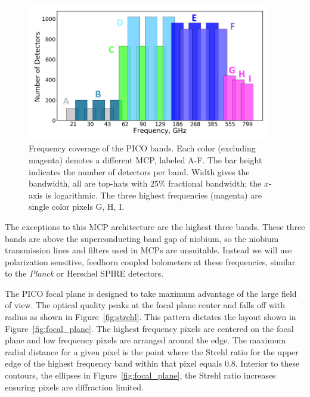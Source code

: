 \documentclass[]{spie}  %
\begin{document}
\begin{figure} [ht]
\begin{center}
\includegraphics[height=6cm]{bands_label.png}
\end{center}
\caption { \label{fig:bands} 
Frequency coverage of the PICO bands. Each color (excluding magenta) denotes a different MCP, labeled A-F. The bar height 
indicates the number of detectors per band.  Width gives the bandwidth, all are top-hats with 
25\% fractional bandwidth; the $x$-axis is logarithmic.  The three highest frequencies (magenta) are single color pixels G, H, I.
}
\end{figure} 

The exceptions to this MCP architecture are the highest three bands.  These three bands are above the superconducting band gap of niobium, so 
the niobium transmission lines and filters used in MCPs are unsuitable.  Instead we will use polarization sensitive, feedhorn 
coupled bolometers at these frequencies, similar to the \textit{Planck}\cite{planck2010_hfi} or Herschel SPIRE\cite{spire2010} detectors.  

The PICO focal plane is designed to take maximum advantage of the large field of view.  The optical quality peaks at the 
focal plane center and falls off with radius as shown in Figure~\ref{fig:strehl}.  This pattern dictates the layout shown 
in Figure~\ref{fig:focal_plane}. The highest frequency pixels are centered on the focal plane and low frequency pixels are arranged 
around the edge. The maximum radial distance for a given pixel is the point where 
the Strehl ratio for the upper edge of the highest frequency band within that pixel equals 0.8.  Interior to these contours, the ellipses in 
Figure~\ref{fig:focal_plane}, the Strehl ratio increases ensuring pixels are diffraction limited.
\end{document}

